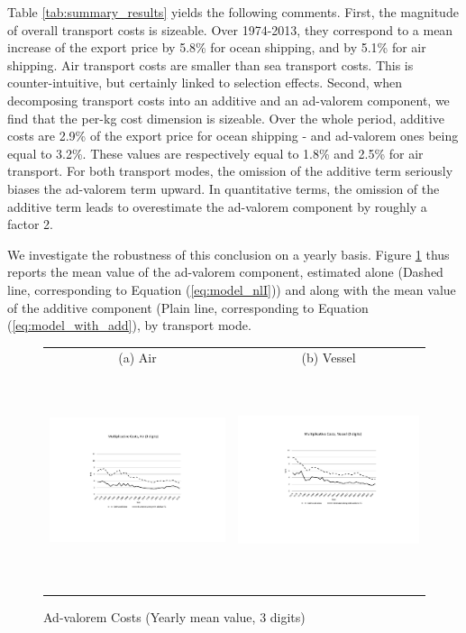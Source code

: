 \documentclass[a4paper,11pt]{article}
\begin{document}
Table \ref{tab:summary_results} yields the following comments. First, the magnitude of overall transport costs is sizeable. Over 1974-2013, they correspond to a mean increase of the export price by 5.8\% for ocean shipping, and by 5.1\% for air shipping. Air transport costs are smaller than sea transport costs. This is counter-intuitive, but certainly linked to selection effects.
Second, when decomposing transport costs into an additive and an ad-valorem component, we find that the per-kg cost dimension is sizeable. Over the whole period, additive costs are 2.9\% of the export price for ocean shipping  - and ad-valorem ones being equal to 3.2\%. These values are respectively equal to 1.8\% and 2.5\% for air transport. For both transport modes, the omission of the additive term seriously biases the ad-valorem term upward. In quantitative terms, the omission of the additive term leads to overestimate the ad-valorem component by roughly a factor 2.

We investigate the robustness of this conclusion on a yearly basis. Figure \ref{fig:mult_alone_withadd} thus reports the mean value of the ad-valorem component, estimated alone (Dashed line, corresponding to Equation (\ref{eq:model_nlI})) and along with the mean value of the additive component (Plain line, corresponding to Equation (\ref{eq:model_with_add}), by transport mode.

\begin{figure}[htbp]
\caption{Ad-valorem Costs (Yearly mean value, 3 digits)}
\label{fig:mult_alone_withadd}
\begin{center}
\begin{tabular}{cc}
{\small (a) Air } & {\small (b) Vessel}\\
\includegraphics[width=3in, height=2.5in]{Fig1a_mult_air_3d.pdf}
& \includegraphics[width=3in,height=2.5in]{Fig1b_mult_vessel_3d.pdf} \\
\end{tabular}
\end{center}
\end{figure}
\end{document}
